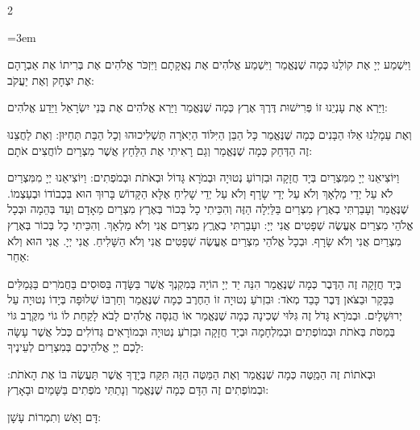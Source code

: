\documentclass[11pt, openany]{book}
\newenvironment{bilingual}{%
  \par\vspace{4pt}%
  \begin{paracol}{2}%
}{%
  \end{paracol}%
  \par\vspace{2pt}%
}
\newenvironment{hebrewcol}{%
  \switchcolumn[1]%
  \begingroup
  \RTL
  \hebrewfont\large
  \setstretch{1.4}%
  \emergencystretch=3em
  \tolerance=9999
  \parindent=0pt\relax
}{%
  \endRTL
  \endgroup
}
\begin{document}
\begin{bilingual}
\begin{hebrewcol}
וַיִּשְׁמַע יְיָ אֶת קוֹלֵנוּ כְּמָה שֶׁנֶּאֱמַר וַיִּשְׁמַע אֱלֹהִים אֶת נַאֲקָתָם וַיִּזְכֹּר אֱלֹהִים אֶת בְּרִיתוֹ אֶת אַבְרָהָם אֶת יִצְחָק וְאֶת יַעֲקֹב:

וַיַּרְא אֶת עָנְיֵנוּ זוֹ פְּרִישׁוּת דֶּרֶךְ אֶרֶץ כְּמָה שֶׁנֶּאֱמַר וַיַּרְא אֱלֹהִים אֶת בְּנֵי יִשְׂרָאֵל וַיֵּדַע אֱלֹהִים:

וְאֶת עַמָלֵנוּ אֵלּוּ הַבָּנִים כְּמָה שֶׁנֶּאֱמַר כָּל הַבֵּן הַיִּלּוֹד הַיְאֹרָה תַּשְׁלִיכוּהוּ וְכָל הַבַּת תְּחַיּוּן: וְאֶת לַחֲצֵנוּ זֶה הַדְּחַק כְּמָה שֶׁנֶּאֱמַר וְגַם רָאִיתִי אֶת הַלַּחַץ אֲשֶׁר מִצְרַיִם לוֹחֲצִים אֹתָם:

וַיּוֹצִיאֵנוּ יְיָ מִמִּצְרַיִם בְּיָד חֲזָקָה וּבִזְרוֹעַ נְטוּיָה וּבְמֹרָא גָּדוֹל וּבְאֹתֹת וּבְמֹפְתִים: וַיּוֹצִיאֵנוּ יְיָ מִמִּצְרַיִם לֹא עַל יְדֵי מַלְאָךְ וְלֹא עַל יְדֵי שָׂרָף וְלֹא עַל יְדֵי שָׁלִיחַ אֶלָּא הַקָּדוֹשׁ בָּרוּךְ הוּא בִּכְבוֹדוֹ וּבְעַצְמוֹ. שֶׁנֶּאֱמַר וְעָבַרְתִּי בְאֶרֶץ מִצְרַיִם בַּלַּיְלָה הַזֶּה וְהִכֵּיתִי כָל בְּכוֹר בְּאֶרֶץ מִצְרַיִם מֵאָדָם וְעַד בְּהֵמָה וּבְכָל אֱלֹהֵי מִצְרַיִם אֶעֱשֶׂה שְׁפָטִים אֲנִי יְיָ: ועָבַרְתִּי בְאֶרֶֶץ מִצְרַיִם אֲנִי וְלֹא מַלְאָךְ. וְהִכֵּיתִי כָל בְּכוֹר בְּאֶרֶץ מִצְרַיִם אֲנִי וְלֹא שָׂרָף. וּבְכָל אֱלֹהֵי מִצְרַיִם אֶעֱשֶׂה שְׁפָטִים אֲנִי וְלֹא הַשָּׁלִיחַ. אֲנִי יְיָ. אֲנִי הוּא וְלֹא אַחֵר:

בְּיָד חֲזָקָה זֶה הַדֶּבֶר כְּמָה שֶׁנֶּאֱמַר הִנֵּה יַד יְיָ הוֹיָה בְּמִקְנְךָ אֲשֶׁר בַּשָּׂדֶה בַּסּוּסִים בַּחֲמֹרִים בַּגְּמַלִּים בַּבָּקָר וּבַצֹּאן דֶּבֶר כָּבֵד מְאֹד: וּבִזְרֹעַ נְטוּיָה זוֹ הַחֶרֶב כְּמָה שֶׁנֶּאֱמַר וְחַרְבּוֹ שְׁלוּפָה בְּיָדוֹ נְטוּיָה עַל יְרוּשָׁלָיִם. וּבְמֹרָא גָּדֹל זֶה גִּלּוּי שְׁכִינָה כְּמָה שֶׁנֶּאֱמַר אוֹ הֲנִסָּה אֱלֹהִים לָבֹא לָקַחַת לוֹ גוֹי מִקֶּרֶב גּוֹי בְּמַסֹּת בְּאֹתֹת וּבְמוֹפְתִים וּבְמִלְחָמָה וּבְיָד חֲזָקָה וּבִזְרֹעַ נְטוּיָה וּבְמוֹרָאִים גְּדוֹלִים כְּכֹל אֲשֶׁר עָשָׂה לָכֶם יְיָ אֱלֹהֵיכֶם בְּמִצְרַיִם לְעֵינֶיךָ:

וּבְאֹתוֹת זֶה הַמַַטֶּה כְּמָה שֶׁנֶּאֱמַר וְאֶת הַמַּטֶּה הַזֶּה תִּקַּח בְּיָדֶךָ אֲשֶׁר תַּעֲשֶׂה בּוֹ אֶת הָאֹתֹת: וּבְמוֹפְתִים זֶה הַדָּם כְּמָה שֶׁנֶּאֱמַר וְנָתַתִּי מֹפְתִים בַּשָּׁמַיִם וּבָאָרֶץ:

דָּם וָאֵשׁ וְתִמְרוֹת עָשָׁן:


\end{hebrewcol}
\end{bilingual}
\end{document}
